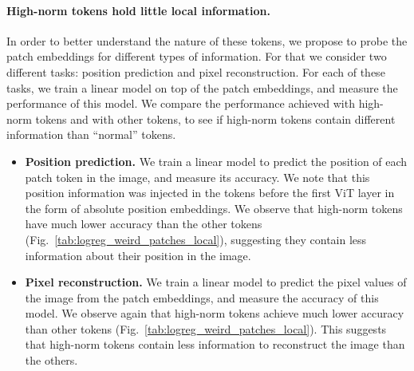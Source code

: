 \documentclass{article} \usepackage{iclr2024_conference,times}
\newcommand{\new}[1]{{#1}}
\newcommand{\old}[1]{}
\begin{document}
\paragraph{High-norm tokens hold little local information.}
In order to better understand the nature of these tokens, we propose to probe the patch embeddings for different types of information. 
For that we consider two different tasks: position prediction and pixel reconstruction. 
For each of these tasks, we \old{will} train a linear model on top of the patch embeddings, and measure the performance of this model. 
We \old{will} compare the performance \old{of this model}\new{achieved with}\old{on the} high-norm tokens and \old{on the}\new{with} other tokens, to see if \old{the} high-norm tokens contain different information than \old{the other}\new{``normal''} tokens.

\begin{itemize}
  \item \textbf{Position prediction.}
  We train a linear model to predict the position of each patch token in the image, and measure its accuracy. We note that this position information was injected in the tokens before the first ViT layer in the form of absolute position embeddings.
  We observe that high-norm tokens have \old{a} much lower accuracy than the other tokens (Fig.~\ref{tab:logreg_weird_patches_local}), suggesting
  they contain less information about their position in the image.\old{ than other tokens.}
  \item \textbf{Pixel reconstruction.}
  We train a linear model to predict the pixel values of the image from the patch embeddings, and measure the accuracy of this model.
  We observe \new{again} that \old{the} high-norm tokens \new{achieve}\old{have a} much lower accuracy than \old{the} other tokens (Fig.~\ref{tab:logreg_weird_patches_local}).
  This suggests that \old{the} high-norm tokens contain less information to reconstruct the image than the others.
\end{itemize}
\end{document}
